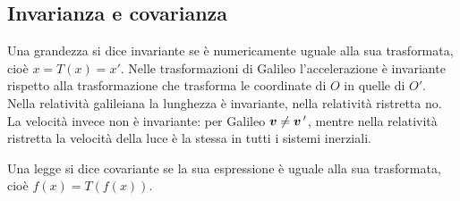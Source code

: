\subsection{Invarianza e covarianza}
Una grandezza si dice invariante se è numericamente uguale alla sua trasformata, cioè $x=T(x)=x'$. Nelle trasformazioni di Galileo l'accelerazione è invariante rispetto alla trasformazione che trasforma le coordinate di $O$ in quelle di $O'$. Nella relatività galileiana la lunghezza è invariante, nella relatività ristretta no. La velocità invece non è invariante: per Galileo $\boldsymbol{v}\neq\boldsymbol{v}\,'$, mentre nella relatività ristretta la velocità della luce è la stessa in tutti i sistemi inerziali.

Una legge si dice covariante se la sua espressione è uguale alla sua trasformata, cioè $f(x)=T(f(x))$.